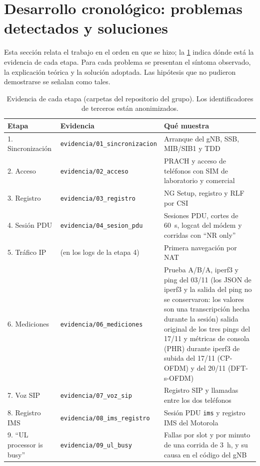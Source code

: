 \section{Desarrollo cronológico: problemas detectados y soluciones}\label{sec:crono}

Esta sección relata el trabajo en el orden en que se hizo; la \cref{tab:evidencia} indica dónde está la evidencia de cada etapa. Para cada problema se presentan el síntoma observado, la explicación teórica y la solución adoptada. Las hipótesis que no pudieron demostrarse se señalan como tales.

\begin{table}[htbp]
\centering
\caption{Evidencia de cada etapa (carpetas del repositorio del grupo). Los identificadores de terceros están anonimizados.}
\label{tab:evidencia}
\begin{tabularx}{\linewidth}{lXX}
\toprule
Etapa & Evidencia & Qué muestra \\
\midrule
1. Sincronización & \texttt{evidencia/01\_sincronizacion} & Arranque del gNB, SSB, MIB/SIB1 y TDD \\
2. Acceso & \texttt{evidencia/02\_acceso} & PRACH y acceso de teléfonos con SIM de laboratorio y comercial \\
3. Registro & \texttt{evidencia/03\_registro} & NG Setup, registro y RLF por CSI \\
4. Sesión PDU & \texttt{evidencia/04\_sesion\_pdu} & Sesiones PDU, cortes de 60~s, logcat del módem y corridas con ``NR only'' \\
5. Tráfico IP & (en los logs de la etapa 4) & Primera navegación por NAT \\
6. Mediciones & \texttt{evidencia/06\_mediciones} & Prueba A/B/A, iperf3 y ping del 03/11 (los JSON de iperf3 y la salida del ping no se conservaron: los valores son una transcripción hecha durante la sesión) salida original de los tres pings del 17/11 y métricas de consola (PHR) durante iperf3 de subida del 17/11 (CP-OFDM) y del 20/11 (DFT-s-OFDM) \\
7. Voz SIP & \texttt{evidencia/07\_voz\_sip} & Registro SIP y llamadas entre los dos teléfonos \\
8. Registro IMS & \texttt{evidencia/08\_ims\_registro} & Sesión PDU \texttt{ims} y registro IMS del Motorola \\
9. ``UL processor is busy'' & \texttt{evidencia/09\_ul\_busy} & Fallas por slot y por minuto de una corrida de 3~h, y su causa en el código del gNB \\
\bottomrule
\end{tabularx}
\end{table}

